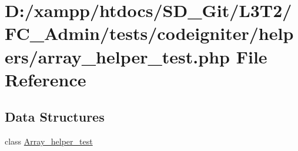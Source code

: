 \hypertarget{_admin_2tests_2codeigniter_2helpers_2array__helper__test_8php}{}\section{D\+:/xampp/htdocs/\+S\+D\+\_\+\+Git/\+L3\+T2/\+F\+C\+\_\+\+Admin/tests/codeigniter/helpers/array\+\_\+helper\+\_\+test.php File Reference}
\label{_admin_2tests_2codeigniter_2helpers_2array__helper__test_8php}
\subsection*{Data Structures}
\begin{DoxyCompactItemize}
\item 
class \hyperlink{class_array__helper__test}{Array\+\_\+helper\+\_\+test}
\end{DoxyCompactItemize}
